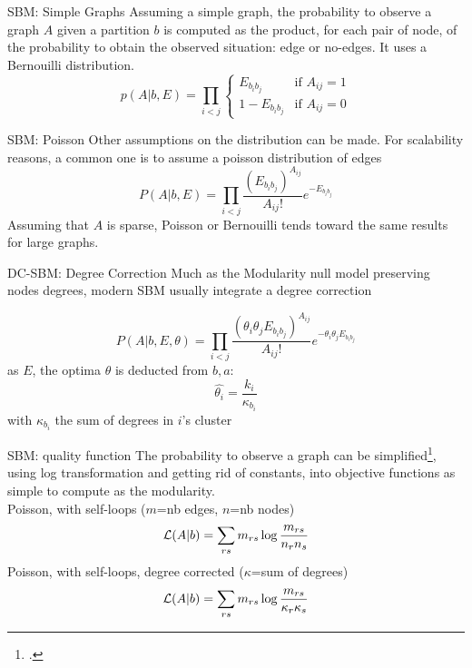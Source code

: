 \begin{textbox}{SBM: Simple Graphs}
    Assuming a simple graph, the probability to observe a graph $A$ given a partition $b$ is computed as the product, for each pair of node, of the probability to obtain the observed situation: edge or no-edges. It uses a Bernouilli distribution.
    \[
        p(A|b,E)=\prod_{i<j}\begin{cases} E_{b_i b_j}    & \text{if } A_{ij}=1 \\
              1- E_{b_i b_j} & \text{if } A_{ij}=0\end{cases}
    \]
\end{textbox}

\begin{textbox}{SBM: Poisson}
    Other assumptions on the distribution can be made. For scalability reasons, a common one is to assume a poisson distribution of edges
    \[
        P(A|b,E)=\prod_{i<j}\frac{(E_{b_ib_j})^{A_{ij}}}{A_{ij}!}e^{-E_{b_ib_j}}
    \]
    Assuming that $A$ is sparse, Poisson or Bernouilli tends toward the same results for large graphs.
\end{textbox}

\begin{textbox}{DC-SBM: Degree Correction}
    Much as the Modularity null model preserving nodes degrees, modern SBM usually integrate a degree correction

    \[
        P(A|b,E,\theta)=\prod_{i<j}\frac{(\theta_i \theta_j E_{b_ib_j})^{A_{ij}}}{A_{ij}!}e^{-\theta_i \theta_j E_{b_ib_j}}
    \]
    as $E$, the optima $\theta$ is deducted from $b,a$:
    \[
        \hat{\theta_i}=\frac{k_i}{\kappa_{b_i}}
    \]
    with $\kappa_{b_i}$ the sum of degrees in $i$'s cluster
\end{textbox}


\begin{textbox}{SBM: quality function}
    The probability to observe a graph can be simplified\footcite{karrer2011stochastic}, using log transformation and getting rid of constants, into objective functions as simple to compute as the modularity.\\
    Poisson, with self-loops ($m$=nb edges, $n$=nb nodes)
    \[
        \mathcal{L}(A|b)=\sum_{rs}m_{rs}\log\frac{m_{rs}}{n_r n_s}{\displaystyle}
    \]
    Poisson, with self-loops, degree corrected ($\kappa$=sum of degrees)
    \[
        \mathcal{L}(A|b)=\sum_{rs}m_{rs}\log\frac{m_{rs}}{\kappa_r \kappa_s}{\displaystyle}
    \]
\end{textbox}

